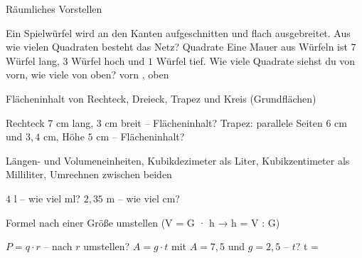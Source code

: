 \setcounter{aufgabe}{0}

\begin{aufgabe}{Räumliches Vorstellen}
\begin{teile}
\teil Ein Spielwürfel wird an den Kanten aufgeschnitten und flach ausgebreitet. Aus wie vielen Quadraten besteht das Netz? \leerfeld Quadrate
\teil Eine Mauer aus Würfeln ist $7$ Würfel lang, $3$ Würfel hoch und $1$ Würfel tief. Wie viele Quadrate siehst du von vorn, wie viele von oben? vorn \leerfeld , oben \leerfeld
\end{teile}
\end{aufgabe}

\begin{aufgabe}{Flächeninhalt von Rechteck, Dreieck, Trapez und Kreis (Grundflächen)}
\begin{teile}
\teil Rechteck $7$ cm lang, $3$ cm breit – Flächeninhalt? \leerfeld[cm²]
\teil Trapez: parallele Seiten $6$ cm und $3{,}4$ cm, Höhe $5$ cm – Flächeninhalt? \leerfeld[cm²]
\end{teile}
\end{aufgabe}

\begin{aufgabe}{Längen- und Volumeneinheiten, Kubikdezimeter als Liter, Kubikzentimeter als Milliliter, Umrechnen zwischen beiden}
\begin{teile}
\teil $4$ l – wie viel ml? \leerfeld[ml]
\teil $2{,}35$ m – wie viel cm? \leerfeld[cm]
\end{teile}
\end{aufgabe}

\begin{aufgabe}{Formel nach einer Größe umstellen (V = G · h → h = V : G)}
\begin{teile}
\teil $P = q \cdot r$ – nach $r$ umstellen?
\teil $A = g \cdot t$ mit $A = 7{,}5$ und $g = 2{,}5$ – $t$? t = \leerfeld
\end{teile}
\end{aufgabe}

